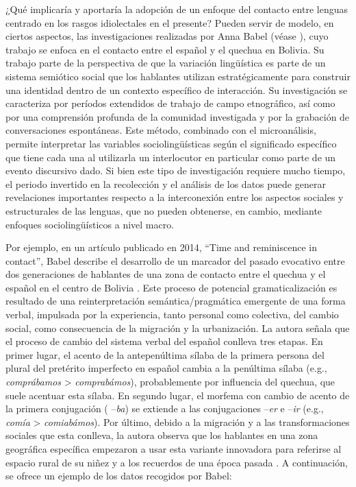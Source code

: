 \documentclass[output=paper]{langscibook}
\begin{document}
¿Qué implicaría y aportaría la adopción de un enfoque del contacto entre lenguas centrado en los rasgos idiolectales en el presente? Pueden servir de modelo, en ciertos aspectos, las investigaciones realizadas por Anna Babel (véase \citealt{Babel2009,Babel2011,Babel2014time,Babel2014stereotypes,Babel2018,Babel2021}), cuyo trabajo se enfoca en el contacto entre el español y el quechua en Bolivia. Su trabajo parte de la perspectiva de que la variación lingüística es parte de un sistema semiótico social que los hablantes utilizan estratégicamente para construir una identidad dentro de un contexto específico de interacción. Su investigación se caracteriza por períodos extendidos de trabajo de campo etnográfico, así como por una comprensión profunda de la comunidad investigada y por la grabación de conversaciones espontáneas. Este método, combinado con el microanálisis, permite interpretar las variables sociolingüísticas según el significado específico que tiene cada una al utilizarla un interlocutor en particular como parte de un evento discursivo dado. Si bien este tipo de investigación requiere mucho tiempo, el periodo invertido en la recolección y el análisis de los datos puede generar revelaciones importantes respecto a la interconexión entre los aspectos sociales y estructurales de las lenguas, que no pueden obtenerse, en cambio, mediante enfoques sociolingüísticos a nivel macro.

Por ejemplo, en un artículo publicado en 2014, “Time and reminiscence in contact”, Babel describe el desarrollo de un marcador del pasado evocativo entre dos generaciones de hablantes de una zona de contacto entre el quechua y el español en el centro de Bolivia \citep{Babel2014stereotypes}. Este proceso de potencial gramaticalización es resultado de una reinterpretación semántica/pragmática emergente de una forma verbal, impulsada por la experiencia, tanto personal como colectiva, del cambio social, como consecuencia de la migración y la urbanización. La autora señala que el proceso de cambio del sistema verbal del español conlleva tres etapas. En primer lugar, el acento de la antepenúltima sílaba de la primera persona del plural del pretérito imperfecto en español cambia a la penúltima sílaba (e.g., \emph {comprábamos} > \emph {comprabámos}), probablemente por influencia del quechua, que suele acentuar esta sílaba. En segundo lugar, el morfema con cambio de acento de la primera conjugación ( –\emph {ba}) se extiende a las conjugaciones –\emph {er} e –\emph {ir} (e.g., \emph {comía} > \emph {comiabámos}). Por último, debido a la migración y a las transformaciones sociales que esta conlleva, la autora observa que los hablantes en una zona geográfica específica empezaron a usar esta variante innovadora para referirse al espacio rural de su niñez y a los recuerdos de una época pasada \citep[312]{Babel2014time}. A continuación, se ofrece un ejemplo de los datos recogidos por Babel:
\end{document}
